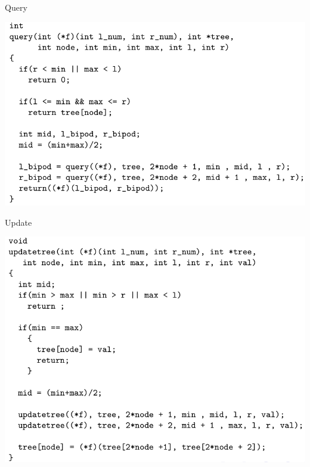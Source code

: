 \documentclass[presentation,12pt]{beamer}
\begin{document}
\begin{frame}[label={sec:orgae0d997}]{Query}
\begin{center}
\includegraphics[width=.9\linewidth]{./img/query.png}
\end{center}
\end{frame}

\begin{frame}[label={sec:orgcf0faf5}]{Update}
\begin{center}
\includegraphics[width=.9\linewidth]{./img/update.png}
\end{center}
\end{frame}
\end{document}
